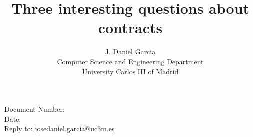 \documentclass[10pt,a4paper,oneside,final,notitlepage]{article}%
\begin{document}


\begin{flushright}
Document Number: \texttt{\paperid}\\
Date: \paperdate\\
Reply to: \url{josedaniel.garcia@uc3m.es}
\end{flushright}

\title{Three interesting questions about contracts}
\author{J. Daniel Garcia\\
Computer Science and Engineering Department\\
University Carlos III of Madrid
}
\date{}

\begingroup
\let\newpage\relax%
\maketitle
\endgroup





\end{document}
